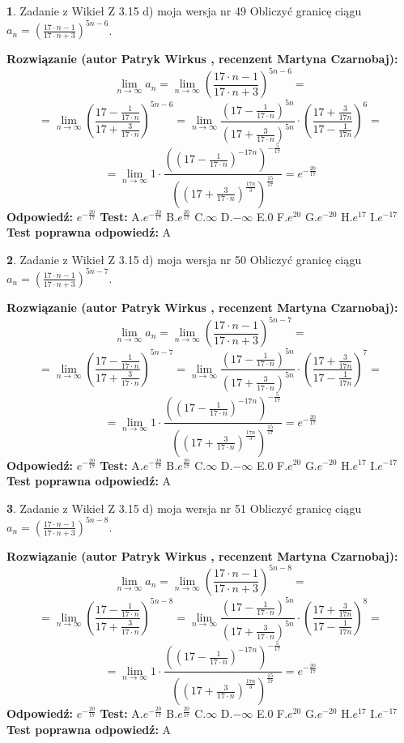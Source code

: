 \documentclass[12pt, a4paper]{article}
\theoremstyle{definition} %
\newtheorem{zad}{}
\newcommand{\zadStart}[1]{\begin{zad}#1\newline}
\newcommand{\zadStop}{\end{zad}}
\newcommand{\rozwStart}[2]{\noindent \textbf{Rozwiązanie (autor #1 , recenzent #2): }\newline}
\newcommand{\rozwStop}{\newline}
\newcommand{\odpStart}{\noindent \textbf{Odpowiedź:}\newline}
\newcommand{\odpStop}{\newline}
\newcommand{\testStart}{\noindent \textbf{Test:}\newline}
\newcommand{\testStop}{\newline}
\newcommand{\kluczStart}{\noindent \textbf{Test poprawna odpowiedź:}\newline}
\newcommand{\kluczStop}{\newline}
\begin{document}
\zadStart{Zadanie z Wikieł Z 3.15 d) moja wersja nr 49}
Obliczyć granicę ciągu $a_{n}=(\frac{17\cdot n - 1}{17 \cdot n + 3})^{5n-6}$.
\zadStop
\rozwStart{Patryk Wirkus}{Martyna Czarnobaj}
$$\lim\limits_{n\to\infty} a_{n} = \lim\limits_{n\to\infty}(\frac{17\cdot n - 1}{17 \cdot n + 3})^{5n-6}=$$
$$=\lim\limits_{n\to\infty}(\frac{17 - \frac{1}{17\cdot n}}{17 + \frac{3}{17 \cdot n}})^{5n-6}=\lim\limits_{n\to\infty}\frac{(17 - \frac{1}{17\cdot n})^{5n}}{(17 + \frac{3}{17\cdot n})^{5n}} \cdot (\frac{17+\frac{3}{17n}}{17-\frac{1}{17n}})^{6}=$$
$$=\lim\limits_{n\to\infty} 1 \cdot \frac{((17-\frac{1}{17 \cdot n})^{-17n})^{-\frac{5}{17}}}{((17+\frac{3}{17 \cdot n})^{\frac{17n}{3}})^{\frac{15}{17}}} =e^{-\frac{20}{17}}$$
\rozwStop
\odpStart
$e^{-\frac{20}{17}}$
\odpStop
\testStart
A.$ e^{-\frac{20}{17}}$
B.$ e^{\frac{20}{17}}$
C.$\infty$
D.$-\infty$
E.$0$
F.$e^{20}$
G.$e^{-20}$
H.$e^{17}$
I.$e^{-17}$
\testStop
\kluczStart
A
\kluczStop



\zadStart{Zadanie z Wikieł Z 3.15 d) moja wersja nr 50}
Obliczyć granicę ciągu $a_{n}=(\frac{17\cdot n - 1}{17 \cdot n + 3})^{5n-7}$.
\zadStop
\rozwStart{Patryk Wirkus}{Martyna Czarnobaj}
$$\lim\limits_{n\to\infty} a_{n} = \lim\limits_{n\to\infty}(\frac{17\cdot n - 1}{17 \cdot n + 3})^{5n-7}=$$
$$=\lim\limits_{n\to\infty}(\frac{17 - \frac{1}{17\cdot n}}{17 + \frac{3}{17 \cdot n}})^{5n-7}=\lim\limits_{n\to\infty}\frac{(17 - \frac{1}{17\cdot n})^{5n}}{(17 + \frac{3}{17\cdot n})^{5n}} \cdot (\frac{17+\frac{3}{17n}}{17-\frac{1}{17n}})^{7}=$$
$$=\lim\limits_{n\to\infty} 1 \cdot \frac{((17-\frac{1}{17 \cdot n})^{-17n})^{-\frac{5}{17}}}{((17+\frac{3}{17 \cdot n})^{\frac{17n}{3}})^{\frac{15}{17}}} =e^{-\frac{20}{17}}$$
\rozwStop
\odpStart
$e^{-\frac{20}{17}}$
\odpStop
\testStart
A.$ e^{-\frac{20}{17}}$
B.$ e^{\frac{20}{17}}$
C.$\infty$
D.$-\infty$
E.$0$
F.$e^{20}$
G.$e^{-20}$
H.$e^{17}$
I.$e^{-17}$
\testStop
\kluczStart
A
\kluczStop



\zadStart{Zadanie z Wikieł Z 3.15 d) moja wersja nr 51}
Obliczyć granicę ciągu $a_{n}=(\frac{17\cdot n - 1}{17 \cdot n + 3})^{5n-8}$.
\zadStop
\rozwStart{Patryk Wirkus}{Martyna Czarnobaj}
$$\lim\limits_{n\to\infty} a_{n} = \lim\limits_{n\to\infty}(\frac{17\cdot n - 1}{17 \cdot n + 3})^{5n-8}=$$
$$=\lim\limits_{n\to\infty}(\frac{17 - \frac{1}{17\cdot n}}{17 + \frac{3}{17 \cdot n}})^{5n-8}=\lim\limits_{n\to\infty}\frac{(17 - \frac{1}{17\cdot n})^{5n}}{(17 + \frac{3}{17\cdot n})^{5n}} \cdot (\frac{17+\frac{3}{17n}}{17-\frac{1}{17n}})^{8}=$$
$$=\lim\limits_{n\to\infty} 1 \cdot \frac{((17-\frac{1}{17 \cdot n})^{-17n})^{-\frac{5}{17}}}{((17+\frac{3}{17 \cdot n})^{\frac{17n}{3}})^{\frac{15}{17}}} =e^{-\frac{20}{17}}$$
\rozwStop
\odpStart
$e^{-\frac{20}{17}}$
\odpStop
\testStart
A.$ e^{-\frac{20}{17}}$
B.$ e^{\frac{20}{17}}$
C.$\infty$
D.$-\infty$
E.$0$
F.$e^{20}$
G.$e^{-20}$
H.$e^{17}$
I.$e^{-17}$
\testStop
\kluczStart
A
\kluczStop
\end{document}
